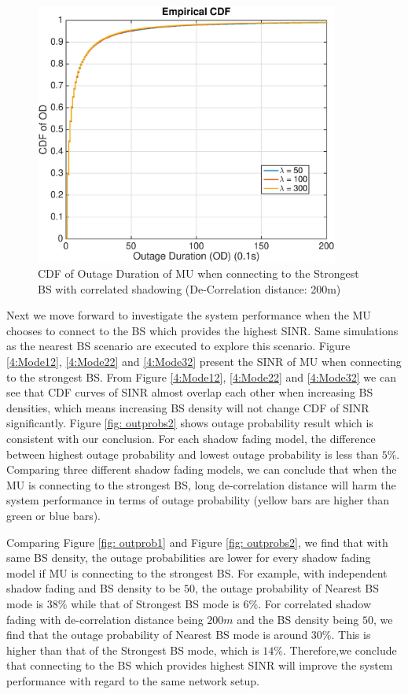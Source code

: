  \begin{figure}
 \centering
 \includegraphics[width=10cm]{ODthresh-5DeCorr200MaxMode2.eps}
 \caption{CDF of Outage Duration of MU when connecting to the Strongest BS with correlated shadowing (De-Correlation distance: 200m)}
 \label{corr2}
 \end{figure}
 \par Next we move forward to investigate the system performance when the MU chooses to connect to the BS which provides the highest SINR. Same simulations as the nearest BS scenario are executed to explore this scenario. Figure \ref{4:Mode12}, \ref{4:Mode22} and \ref{4:Mode32} present the SINR of MU when connecting to the strongest BS. From Figure \ref{4:Mode12}, \ref{4:Mode22} and \ref{4:Mode32} we can see that CDF curves of SINR almost overlap each other when increasing BS densities, which means increasing BS density will not change CDF of SINR significantly. Figure \ref{fig: outprobs2} shows outage probability result which is consistent with our conclusion. For each shadow fading model, the difference between highest outage probability and lowest outage probability is less than $5\%$. Comparing three different shadow fading models, we can conclude that when the MU is connecting to the strongest BS, long de-correlation distance will harm the system performance in terms of outage probability (yellow bars are higher than green or blue bars). 
 \par Comparing Figure \ref{fig: outprob1} and Figure \ref{fig: outprobs2}, we find that with same BS density, the outage probabilities are lower for every shadow fading model if MU is connecting to the strongest BS. For example, with independent shadow fading and BS density to be $50$, the outage probability of Nearest BS mode is $38\%$ while that of Strongest BS mode is $6\%$. For correlated shadow fading with de-correlation distance being $200m$ and the BS density being $50$, we find that the outage probability of Nearest BS mode is around $30\%$. This is higher than that of the Strongest BS mode, which is $14\%$. Therefore,we conclude that connecting to the BS which provides highest SINR will improve the system performance with regard to the same network setup. 








